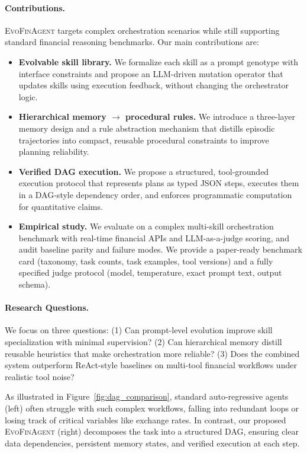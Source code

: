 \documentclass{article}
\begin{document}
\paragraph{Contributions.}
\textsc{EvoFinAgent} targets complex orchestration scenarios while still supporting standard financial reasoning benchmarks. Our main contributions are:
\begin{itemize}
  \item \textbf{Evolvable skill library.} We formalize each skill as a prompt genotype with interface constraints and propose an LLM-driven mutation operator that updates skills using execution feedback, without changing the orchestrator logic.
  \item \textbf{Hierarchical memory $\rightarrow$ procedural rules.} We introduce a three-layer memory design and a rule abstraction mechanism that distills episodic trajectories into compact, reusable procedural constraints to improve planning reliability.
  \item \textbf{Verified DAG execution.} We propose a structured, tool-grounded execution protocol that represents plans as typed JSON steps, executes them in a DAG-style dependency order, and enforces programmatic computation for quantitative claims.
  \item \textbf{Empirical study.} We evaluate on a complex multi-skill orchestration benchmark with real-time financial APIs and LLM-as-a-judge scoring, and audit baseline parity and failure modes. We provide a paper-ready benchmark card (taxonomy, task counts, task examples, tool versions) and a fully specified judge protocol (model, temperature, exact prompt text, output schema).
\end{itemize}

\paragraph{Research Questions.}
We focus on three questions: (1) Can prompt-level evolution improve skill specialization with minimal supervision? (2) Can hierarchical memory distill reusable heuristics that make orchestration more reliable? (3) Does the combined system outperform ReAct-style baselines on multi-tool financial workflows under realistic tool noise?

As illustrated in Figure~\ref{fig:dag_comparison}, standard auto-regressive agents (left) often struggle with such complex workflows, falling into redundant loops or losing track of critical variables like exchange rates. In contrast, our proposed \textsc{EvoFinAgent} (right) decomposes the task into a structured DAG, ensuring clear data dependencies, persistent memory states, and verified execution at each step.
\end{document}
